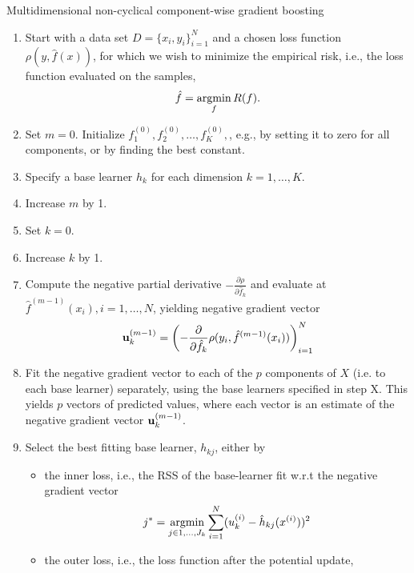 \begin{algorithm}
\caption{Multidimensional non-cyclical component-wise gradient boosting}
\label{algo:multi-non-cyclical}
\begin{enumerate}
    \item Start with a data set $D=\{x_i, y_i\}_{i=1}^N$ and a chosen loss function $\rho(y,\hat{f}(x))$, for which we wish to
        minimize the empirical risk, i.e., the loss function evaluated on the samples,
        \begin{equation}
            \hat{f}=\operatorname*{argmin}_{f}R(f).
        \end{equation}
    \item Set $m=0$. Initialize $f^{(0)}_1,f^{(0)}_2,\ldots,f^{(0)}_K,$, e.g., by setting it to zero for all components, or by finding the best constant.%
    \item Specify a base learner $h_k$ for each dimension $k=1,\ldots,K$.
    \item Increase $m$ by 1.
    \item Set $k=0$.
    \item Increase $k$ by 1.
    \item Compute the negative partial derivative $-\frac{\partial\rho}{\partial \hat{f}_k}$
        and evaluate at $\hat{f}^{(m-1)}(x_i),i=1,\ldots,N$, yielding negative gradient vector
        \begin{equation}
            \mathbf{u}^{(m-1)}_k=\left(-\frac{\partial}{\partial \hat{f}_k}\rho(y_i, \hat{f}^{(m-1)}(x_i))\right)_{i=1}^N
        \end{equation}
    \item Fit the negative gradient vector to each of the $p$ components of $X$ (i.e. to each base learner) separately, using the base learners specified in step X. This yields $p$ vectors of predicted values, where each vector is an estimate of the negative gradient vector $\mathbf{u}^{(m-1)}_k$.
    \item Select the best fitting base learner, $h_{kj}$, either by
        \begin{itemize}
            \item the inner loss, i.e., the RSS of the base-learner fit w.r.t the negative gradient vector
                \begin{equation}
                    j^*=\operatorname*{argmin}_{j\in 1,\ldots,J_k}\sum_{i=1}^N(u_k^{(i)}-\hat{h}_{kj}(x^{(i)}))^2
                \end{equation}
            \item the outer loss, i.e., the loss function after the potential update,

\end{itemize}
\end{enumerate}
\end{algorithm}
